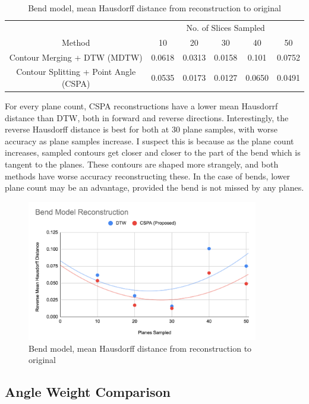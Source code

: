 \documentclass[11p, titlepage]{article}
\begin{document}
\begin{table}[h!]
\begin{tabular}{ | c | c | c | c | c | c | }
\hline
& \multicolumn{5}{c|}{No. of Slices Sampled} \\
\cline{2-6}
Method & 10 & 20 & 30 & 40 & 50 \\
\hline
Contour Merging + DTW (MDTW) & 0.0618 & 0.0313 & 0.0158 & 0.101 & 0.0752 \\
Contour Splitting + Point Angle (CSPA) & 0.0535 & 0.0173 & 0.0127 & 0.0650 & 0.0491 \\
\hline
\end{tabular}
\caption{Bend model, mean Hausdorff distance from reconstruction to original}
\label{table:bend_reverse}
\end{table}

For every plane count, CSPA reconstructions have a lower mean Hausdorrf distance than DTW, both in forward and reverse directions. Interestingly, the reverse Hausdorff distance is best for both at 30 plane samples, with worse accuracy as plane samples increase. I suspect this is because as the plane count increases, sampled contours get closer and closer to the part of the bend which is tangent to the planes. These contours are shaped more strangely, and both methods have worse accuracy reconstructing these. In the case of bends, lower plane count may be an advantage, provided the bend is not missed by any planes.

\begin{figure}[h!]
\centering
\includegraphics[width=0.9\textwidth]{graphs/bend-reverse}
\caption{Bend model, mean Hausdorff distance from reconstruction to original\label{fig:bend_reverse_graph}}
\end{figure}
\pagebreak

\subsection{Angle Weight Comparison}
\end{document}
